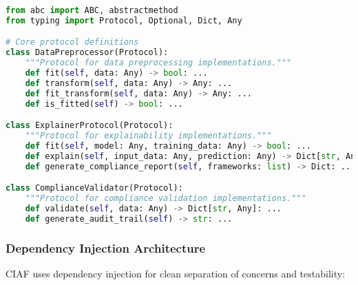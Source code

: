 \documentclass[12pt,a4paper]{article}
\begin{document}
\begin{lstlisting}[language=Python, caption=Protocol-Based Architecture Foundation]
from abc import ABC, abstractmethod
from typing import Protocol, Optional, Dict, Any

# Core protocol definitions
class DataPreprocessor(Protocol):
    """Protocol for data preprocessing implementations."""
    def fit(self, data: Any) -> bool: ...
    def transform(self, data: Any) -> Any: ...
    def fit_transform(self, data: Any) -> Any: ...
    def is_fitted(self) -> bool: ...

class ExplainerProtocol(Protocol):
    """Protocol for explainability implementations."""
    def fit(self, model: Any, training_data: Any) -> bool: ...
    def explain(self, input_data: Any, prediction: Any) -> Dict[str, Any]: ...
    def generate_compliance_report(self, frameworks: list) -> Dict: ...

class ComplianceValidator(Protocol):
    """Protocol for compliance validation implementations."""
    def validate(self, data: Any) -> Dict[str, Any]: ...
    def generate_audit_trail(self) -> str: ...
\end{lstlisting}

\subsubsection{Dependency Injection Architecture}

CIAF uses dependency injection for clean separation of concerns and testability:
\end{document}
